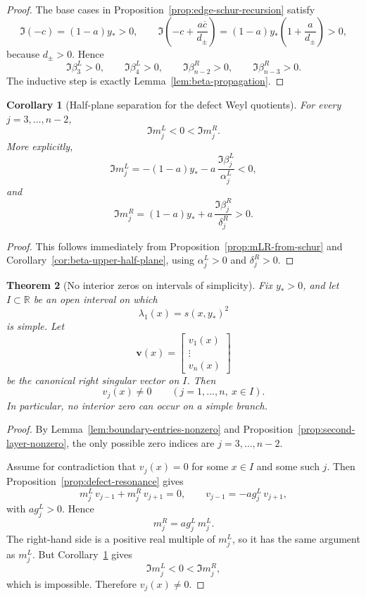 \documentclass[11pt]{article}
\newtheorem{theorem}{Theorem}
\newtheorem{corollary}[theorem]{Corollary}
\begin{document}
\begin{proof}
The base cases in Proposition~\ref{prop:edge-schur-recursion} satisfy
\[
\Im(-c)=(1-a)y_*>0,
\qquad
\Im\!\left(-c+\frac{a\overline c}{d_\pm}\right)
=
(1-a)y_*\left(1+\frac{a}{d_\pm}\right)>0,
\]
because \(d_\pm>0\). Hence
\[
\Im \beta_3^L>0,\qquad \Im \beta_4^L>0,
\qquad
\Im \beta_{n-2}^R>0,\qquad \Im \beta_{n-3}^R>0.
\]
The inductive step is exactly Lemma~\ref{lem:beta-propagation}.
\end{proof}

\begin{corollary}[Half-plane separation for the defect Weyl quotients]\label{cor:mLR-half-plane}
For every \(j=3,\dots,n-2\),
\[
\Im m_j^L<0<\Im m_j^R.
\]
More explicitly,
\[
\Im m_j^L
=
-(1-a)y_* - a\,\frac{\Im\beta_j^L}{\alpha_j^L}<0,
\]
and
\[
\Im m_j^R
=
(1-a)y_* + a\,\frac{\Im\beta_j^R}{\delta_j^R}>0.
\]
\end{corollary}

\begin{proof}
This follows immediately from Proposition~\ref{prop:mLR-from-schur} and
Corollary~\ref{cor:beta-upper-half-plane}, using \(\alpha_j^L>0\) and \(\delta_j^R>0\).
\end{proof}

\begin{theorem}[No interior zeros on intervals of simplicity]\label{thm:no-interior-zeros-simple-interval}
Fix \(y_*>0\), and let \(I\subset\mathbb R\) be an open interval on which
\[
\lambda_1(x)=s(x,y_*)^2
\]
is simple. Let
\[
\mathbf v(x)=
\begin{bmatrix}
v_1(x)\\
\vdots\\
v_n(x)
\end{bmatrix}
\]
be the canonical right singular vector on \(I\). Then
\[
v_j(x)\neq 0
\qquad
(j=1,\dots,n,\ x\in I).
\]
In particular, no interior zero can occur on a simple branch.
\end{theorem}

\begin{proof}
By Lemma~\ref{lem:boundary-entries-nonzero} and Proposition~\ref{prop:second-layer-nonzero},
the only possible zero indices are \(j=3,\dots,n-2\).

Assume for contradiction that \(v_j(x)=0\) for some \(x\in I\) and some such \(j\). Then
Proposition~\ref{prop:defect-resonance} gives
\[
m_j^L\,v_{j-1}+m_j^R\,v_{j+1}=0,
\qquad
v_{j-1}=-a g_j^L\,v_{j+1},
\]
with \(a g_j^L>0\). Hence
\[
m_j^R = a g_j^L\, m_j^L.
\]
The right-hand side is a positive real multiple of \(m_j^L\), so it has the same argument as
\(m_j^L\). But Corollary~\ref{cor:mLR-half-plane} gives
\[
\Im m_j^L<0<\Im m_j^R,
\]
which is impossible. Therefore \(v_j(x)\neq 0\).
\end{proof}
\end{document}
